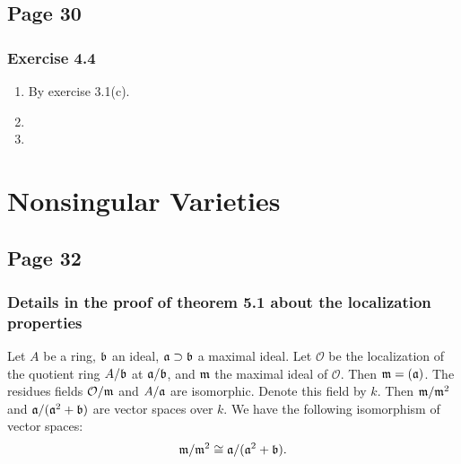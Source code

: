 \documentclass{note}
\newcommand{\Page}[1]{\subsection*{Page #1}}
\newcommand{\Ex}[1]{\subsubsection*{Exercise #1}}
\begin{document}
\Page{30}
\Ex{4.4}
\begin{enumerate}
\item By exercise 3.1(c).
\item
\item
\end{enumerate}

\section{Nonsingular Varieties}
\Page{32}
\subsubsection*{Details in the proof of theorem 5.1 about the
  localization properties}
\begin{proposition*}
  Let $A$ be a ring, $\mathfrak{b}$ an ideal,
  $\mathfrak{a} \supset \mathfrak{b}$ a maximal ideal. Let $\mathcal{O}$ be
  the localization of the quotient ring $A/\mathfrak{b}$ at
  $\mathfrak{a}/\mathfrak{b}$, and $\mathfrak{m}$ the maximal ideal of
  $\mathcal{O}$. Then $\mathfrak{m} = (\mathfrak{a})$. The residues fields
  $\mathcal{O}/\mathfrak{m}$ and $A/\mathfrak{a}$ are isomorphic. Denote
  this field by $k$. Then $\mathfrak{m}/\mathfrak{m}^2$ and
  $\mathfrak{a}/(\mathfrak{a}^2+\mathfrak{b})$ are vector spaces over $k$. We
  have the following isomorphism of vector spaces:
  \begin{equation*}
    \mathfrak{m}/\mathfrak{m}^2 \cong \mathfrak{a}/(\mathfrak{a}^2+\mathfrak{b}).
  \end{equation*}
\end{proposition*}
\end{document}
